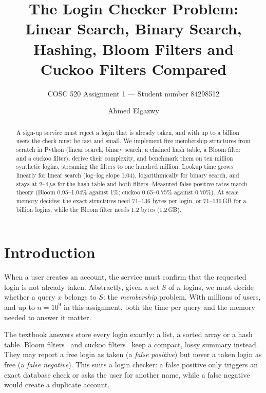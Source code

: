 \documentclass[acmsmall,nonacm]{acmart}
\newcommand{\us}{\,$\mu$s}
\begin{document}
\title{The Login Checker Problem: Linear Search, Binary Search, Hashing, Bloom Filters and Cuckoo Filters Compared}
\subtitle{COSC 520 Assignment 1 --- Student number 84298512}

\author{Ahmed Elgazwy}

\begin{abstract}
A sign-up service must reject a login that is already taken, and with up to a
billion users the check must be fast and small. We implement five membership
structures from scratch in Python (linear search, binary search, a chained hash
table, a Bloom filter and a cuckoo filter), derive their complexity, and
benchmark them on ten million synthetic logins, streaming the filters to one
hundred million. Lookup time grows linearly for linear search (log--log slope
1.04), logarithmically for binary search, and stays at 2--4\us{} for the hash
table and both filters. Measured false-positive rates match theory (Bloom
0.95--1.04\% against 1\%; cuckoo 0.65--0.75\% against 0.70\%). At scale memory
decides: the exact structures need 71--136 bytes per login, or 71--136\,GB for a
billion logins, while the Bloom filter needs 1.2 bytes (1.2\,GB).
\end{abstract}


\maketitle

\section{Introduction}

When a user creates an account, the service must confirm that the requested
login is not already taken. Abstractly, given a set $S$ of $n$ logins, we must
decide whether a query $x$ belongs to $S$: the \emph{membership} problem. With
millions of users, and up to $n = 10^9$ in this assignment, both the time per
query and the memory needed to answer it matter.

The textbook answers store every login exactly: a list, a sorted array or a
hash table. Bloom filters~\cite{bloom1970} and cuckoo filters~\cite{fan2014}
keep a compact, lossy summary instead. They may report a free login as taken (a
\emph{false positive}) but never a taken login as free (a \emph{false
negative}). This suits a login checker: a false positive only triggers an exact
database check or asks the user for another name, while a false negative would
create a duplicate account.
\end{document}
